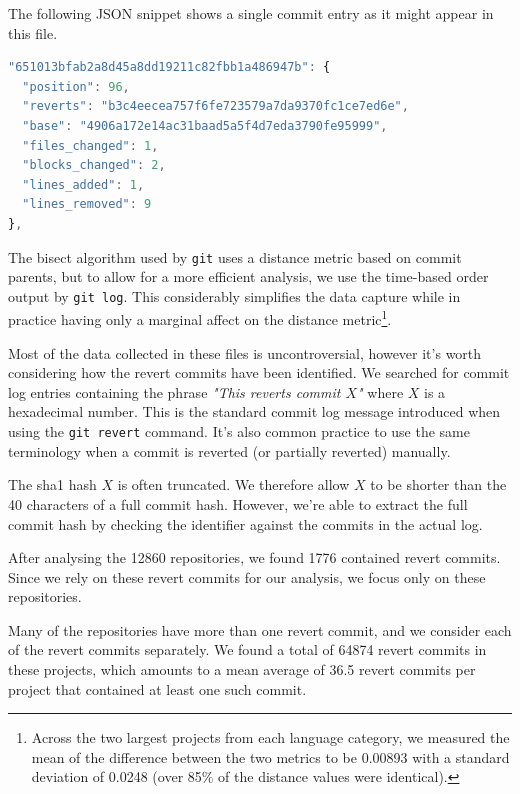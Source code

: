 \documentclass[pdflatex, sn-mathphys, referee]{sn-jnl}%
\theoremstyle{thmstyleone}%
\theoremstyle{thmstyletwo}%
\theoremstyle{thmstylethree}%
\def\code{\tt}
\theoremstyle{thmstyleone}
\begin{document}
The following JSON snippet shows a single commit entry as it might appear in this file.

\begin{lstlisting}[language=JavaScript]
"651013bfab2a8d45a8dd19211c82fbb1a486947b": {
  "position": 96,
  "reverts": "b3c4eecea757f6fe723579a7da9370fc1ce7ed6e",
  "base": "4906a172e14ac31baad5a5f4d7eda3790fe95999",
  "files_changed": 1,
  "blocks_changed": 2,
  "lines_added": 1,
  "lines_removed": 9
},
\end{lstlisting}

The bisect algorithm used by {\code git} uses a distance metric based on commit parents, but to allow for a more efficient analysis, we use the time-based order output by {\code git log}. This considerably simplifies the data capture while in practice having only a marginal affect on the distance metric\footnote{Across the two largest projects from each language category, we measured the mean of the difference between the two metrics to be 0.00893 with a standard deviation of 0.0248 (over 85\% of the distance values were identical).}.

Most of the data collected in these files is uncontroversial, however it's worth considering how the revert commits have been identified. We searched for commit log entries containing the phrase {\it"This reverts commit $X$"\/} where $X$ is a hexadecimal number. This is the standard commit log message introduced when using the {\code git revert} command. It's also common practice to use the same terminology when a commit is reverted (or partially reverted) manually.

The sha1 hash $X$ is often truncated. We therefore allow $X$ to be shorter than the 40 characters of a full commit hash. However, we're able to extract the full commit hash by checking the identifier against the commits in the actual log.

After analysing the 12860 repositories, we found 1776 contained revert commits. Since we rely on these revert commits for our analysis, we focus only on these repositories.

Many of the repositories have more than one revert commit, and we consider each of the revert commits separately. We found a total of 64874 revert commits in these projects, which amounts to a mean average of 36.5 revert commits per project that contained at least one such commit.
\end{document}
